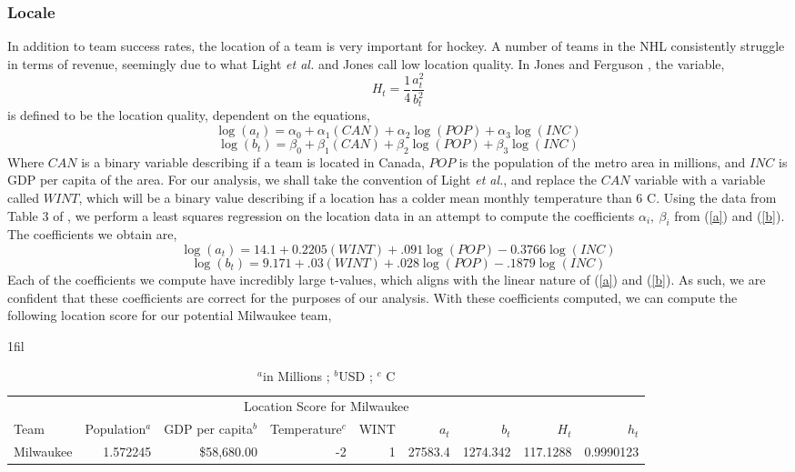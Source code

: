 \documentclass[11pt]{report}            %
\makeatletter
\newcommand*{\centerfloat}{%
  \parindent \z@
  \leftskip \z@ \@plus 1fil \@minus \textwidth
  \rightskip\leftskip
  \parfillskip \z@skip}
\makeatother
\begin{document}
\subsubsection*{Locale}
In addition to team success rates, the location of a team is very important for hockey. A number of teams in the NHL consistently struggle in terms of revenue, seemingly due to what Light \textit{et al.} and Jones call low location quality\cite{light}\cite{jones}. In Jones and Ferguson \cite{jones}, the variable,
\begin{equation}\label{ht}
H_t=\frac{1}{4}\frac{a_t^2}{b_t^2}
\end{equation}
is defined to be the location quality, dependent on the equations,
\begin{equation}\label{a}
\log(a_t) = \alpha_0+\alpha_1(CAN)+\alpha_2\log(POP)+\alpha_3\log(INC)
\end{equation}
\begin{equation}\label{b}
\log(b_t) = \beta_0+\beta_1(CAN)+\beta_2\log(POP)+\beta_3\log(INC)
\end{equation}
Where $CAN$ is a binary variable describing if a team is located in Canada, $POP$ is the population of the metro area in millions, and $INC$ is GDP per capita of the area. For our analysis, we shall take the convention of Light \textit{et al.}, and replace the $CAN$ variable with a variable called $WINT$, which will be a binary value describing if a location has a colder mean monthly temperature than 6 \degree C. Using the data from Table 3 of \cite{light}, we perform a least squares regression on the location data in an attempt to compute the coefficients $\alpha_i,\ \beta_i$ from (\ref{a}) and (\ref{b}). The coefficients we obtain are,
\begin{equation}\label{acoeff}
\log(a_t) = 14.1 + 0.2205(WINT)+.091\log(POP)-0.3766\log(INC)
\end{equation}
\begin{equation}\label{bcoeff}
\log(b_t) = 9.171 + .03(WINT)+.028\log(POP)-.1879\log(INC)
\end{equation}
Each of the coefficients we compute have incredibly large t-values, which aligns with the linear nature of (\ref{a}) and (\ref{b}). As such, we are confident that these coefficients are correct for the purposes of our analysis. With these coefficients computed, we can compute the following location score for our potential Milwaukee team,
\begin{table}[H]
\centerfloat
\begin{tabular}{lrrrrrrrr}
\hline
\multicolumn{9}{c}{Location Score for Milwaukee} \\
Team & Population$^a$ & GDP per capita$^b$ & Temperature$^c$ & WINT & $a_t$ & $b_t$ & $H_t$ & $h_t$\\
\hline
Milwaukee & 1.572245 & \$58,680.00 & -2 & 1 & 27583.4 & 1274.342 & 117.1288 & 0.9990123
\end{tabular}
\caption{$^a$in Millions \cite{population}; $^b$USD \cite{gdp}; $^c$ \degree C \cite{weather}}
\label{table:Milwaukee_H}
\end{table}
\end{document}
